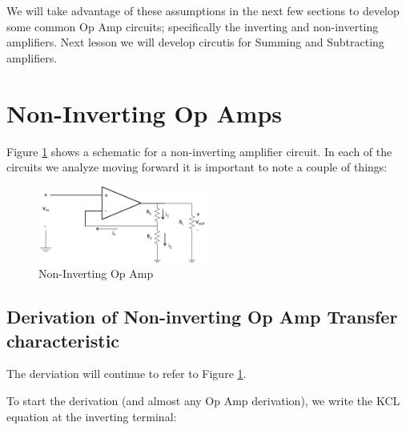 \documentclass{handout}
\begin{document}
We will take advantage of these assumptions in the next few sections to develop some common Op Amp circuits; specifically the inverting  and non-inverting amplifiers.  Next lesson we will develop circutis for Summing and Subtracting amplifiers.

\newpage
\clearpage
\pagebreak

\section{Non-Inverting Op Amps}
Figure \ref{fig: NonInvertingOpAmp} shows a schematic for a non-inverting amplifier circuit.  In each of the circuits we analyze moving forward it is important to note a couple of things:

\begin{figure}
\centering
\includegraphics[width=0.5\textwidth]{NonInvertingOpAmp.jpg}
\caption{Non-Inverting Op Amp}
\label{fig: NonInvertingOpAmp}
\end{figure}

\subsection{Derivation of Non-inverting Op Amp Transfer characteristic}
The derviation will continue to refer to Figure \ref{fig: NonInvertingOpAmp}.

To start the derivation (and almost any Op Amp derivation), we write the KCL equation at the inverting terminal:
\end{document}
